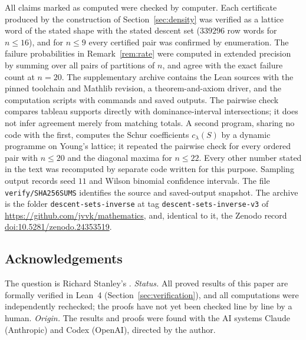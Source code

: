 \documentclass[12pt]{article}
\numberwithin{theorem}{section}
\numberwithin{equation}{section}
\begin{document}
All claims marked as computed were checked by computer. Each certificate produced by the construction of
Section~\ref{sec:density} was verified as a lattice word of the stated shape with the stated descent set
($339296$ row words for $n\le16$), and for $n\le9$ every certified pair was confirmed by enumeration. The failure probabilities in Remark~\ref{rem:rate} were computed in extended precision by summing over all pairs of partitions of $n$, and agree with the exact failure count at $n=20$. The supplementary archive contains the Lean sources with the pinned toolchain and Mathlib revision, a theorem-and-axiom driver, and the computation scripts with commands and saved outputs. The pairwise check compares tableau supports directly with dominance-interval intersections; it does not infer agreement merely from matching totals. A second program, sharing no code with the first, computes the Schur coefficients $c_\lambda(S)$ by a dynamic programme on Young's lattice; it repeated the pairwise check for every ordered pair with $n\le20$ and the diagonal maxima for $n\le22$. Every other number stated in the text was recomputed by separate code written for this purpose. Sampling output records seed $11$ and Wilson binomial confidence intervals. The file \texttt{verify/SHA256SUMS} identifies the source and saved-output snapshot. The archive is the folder \texttt{descent-sets-inverse} at tag \texttt{descent-sets-inverse-v3} of \url{https://github.com/jvvk/mathematics}, and, identical to it, the Zenodo record \href{https://doi.org/10.5281/zenodo.24353519}{doi:10.5281/zenodo.24353519}.

\subsection*{Acknowledgements}

The question is Richard Stanley's \cite{stanleyMO}. \emph{Status.} All proved results of this paper are formally verified in Lean~4 (Section~\ref{sec:verification}), and all computations
were independently rechecked; the proofs have not yet been checked line by line by a human. \emph{Origin.} The results and
proofs were found with the AI systems Claude (Anthropic) and Codex (OpenAI), directed by the author.
\end{document}
